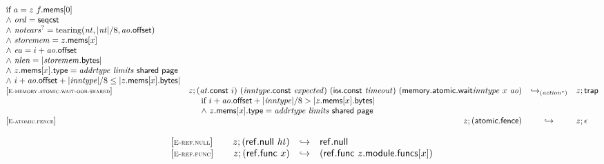 $$\begin{array}[t]{@{}lrcl@{}l@{}}
\begin{array}[t]{@{}l@{}}
\mbox{if}~ a = z~f{.}\mathsf{mems}{}[0] \\
{\land}~ {\mathit{ord}} = \mathsf{seqcst} \\
{\land}~ {{\mathit{notears}}^?} = {\mathrm{tearing}}({\mathit{nt}}, {|{\mathit{nt}}|} / 8, {\mathit{ao}}{.}\mathsf{offset}) \\
{\land}~ {\mathit{storemem}} = z{.}\mathsf{mems}{}[x] \\
{\land}~ {\mathit{ea}} = i + {\mathit{ao}}{.}\mathsf{offset} \\
{\land}~ {\mathit{nlen}} = {|{\mathit{storemem}}{.}\mathsf{bytes}|} \\
{\land}~ z{.}\mathsf{mems}{}[x]{.}\mathsf{type} = {\mathit{addrtype}}~{\mathit{limits}}~\mathsf{shared}~\mathsf{page} \\
{\land}~ i + {\mathit{ao}}{.}\mathsf{offset} + {|{\mathit{inntype}}|} / 8 \leq {|z{.}\mathsf{mems}{}[x]{.}\mathsf{bytes}|} \\
\end{array} \\
{[\textsc{\scriptsize E{-}memory.atomic.wait{-}oob{-}shared}]} \quad & z ; ({\mathit{at}}{.}\mathsf{const}~i)~({\mathit{inntype}}{.}\mathsf{const}~{\mathit{expected}})~(\mathsf{i{\scriptstyle 64}}{.}\mathsf{const}~{\mathit{timeout}})~({\mathsf{memory{.}atomic{.}wait}}{{\mathit{inntype}}}~x~{\mathit{ao}}) & {\hookrightarrow}_{({{\mathit{action}}^\ast})} {} & z ; \mathsf{trap} &  \\
& \multicolumn{4}{@{}l@{}}{\quad
\quad
\begin{array}[t]{@{}l@{}}
\mbox{if}~ i + {\mathit{ao}}{.}\mathsf{offset} + {|{\mathit{inntype}}|} / 8 > {|z{.}\mathsf{mems}{}[x]{.}\mathsf{bytes}|} \\
{\land}~ z{.}\mathsf{mems}{}[x]{.}\mathsf{type} = {\mathit{addrtype}}~{\mathit{limits}}~\mathsf{shared}~\mathsf{page} \\
\end{array}
} \\
{[\textsc{\scriptsize E{-}atomic.fence}]} \quad & z ; (\mathsf{atomic{.}fence}) & \hookrightarrow & z ; \epsilon \\
\end{array}
$$

\vspace{1ex}

$$
\begin{array}[t]{@{}lrcl@{}l@{}}
{[\textsc{\scriptsize E{-}ref.null}]} \quad & z ; (\mathsf{ref{.}null}~{\mathit{ht}}) & \hookrightarrow & \mathsf{ref{.}null} \\
{[\textsc{\scriptsize E{-}ref.func}]} \quad & z ; (\mathsf{ref{.}func}~x) & \hookrightarrow & (\mathsf{ref{.}func}~z{.}\mathsf{module}{.}\mathsf{funcs}{}[x]) \\
\end{array}
$$

